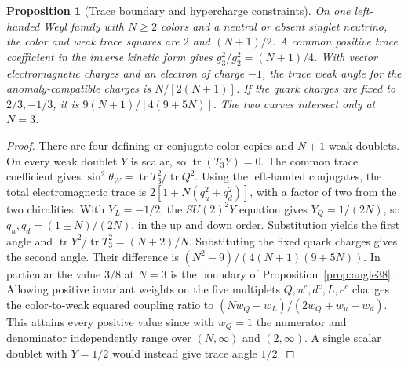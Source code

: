 \documentclass[aps,pra,onecolumn,superscriptaddress,nofootinbib,10pt]{revtex4-2}
\newtheorem{proposition}[theorem]{Proposition}
\theoremstyle{definition}
\theoremstyle{remark}
\begin{document}
\begin{proposition}[Trace boundary and hypercharge constraints]\label{ub:traces}
On one left-handed Weyl family with $N\ge2$ colors and a neutral or absent
singlet neutrino, the color and weak trace squares are $2$ and $(N+1)/2$.
A common positive trace coefficient in the inverse kinetic form gives
$g_3^2/g_2^2=(N+1)/4$. With vector electromagnetic charges and an electron
of charge $-1$, the trace weak angle for the anomaly-compatible charges is
$N/[2(N+1)]$. If the quark charges are fixed to $2/3,-1/3$, it is
$9(N+1)/[4(9+5N)]$. The two curves intersect only at $N=3$.
\end{proposition}
\begin{proof}
There are four defining or conjugate color copies and $N+1$ weak doublets.
On every weak doublet $Y$ is scalar, so $\operatorname{tr}(T_3Y)=0$.
The common trace coefficient gives
$\sin^2\theta_W=\operatorname{tr}T_3^2/\operatorname{tr}Q^2$.
Using the left-handed conjugates, the total electromagnetic trace is
$2[1+N(q_u^2+q_d^2)]$, with a factor of two from the two chiralities.
With $Y_L=-1/2$, the $SU(2)^2Y$ equation gives $Y_Q=1/(2N)$, so
$q_u,q_d=(1\pm N)/(2N)$, in the up and down order. Substitution yields
the first angle and $\operatorname{tr}Y^2/\operatorname{tr}T_3^2=(N+2)/N$.
Substituting the fixed quark charges gives the second angle. Their
difference is $(N^2-9)/(4(N+1)(9+5N))$. In particular the value $3/8$
at $N=3$ is the boundary of Proposition~\ref{prop:angle38}.
Allowing positive invariant weights on the five multiplets
$Q,u^c,d^c,L,e^c$ changes the color-to-weak squared coupling ratio to
$(Nw_Q+w_L)/(2w_Q+w_u+w_d)$. This attains every positive value
since with $w_Q=1$ the numerator and denominator independently range
over $(N,\infty)$ and $(2,\infty)$. A single scalar doublet with $Y=1/2$
would instead give trace angle $1/2$.
\end{proof}
\end{document}
